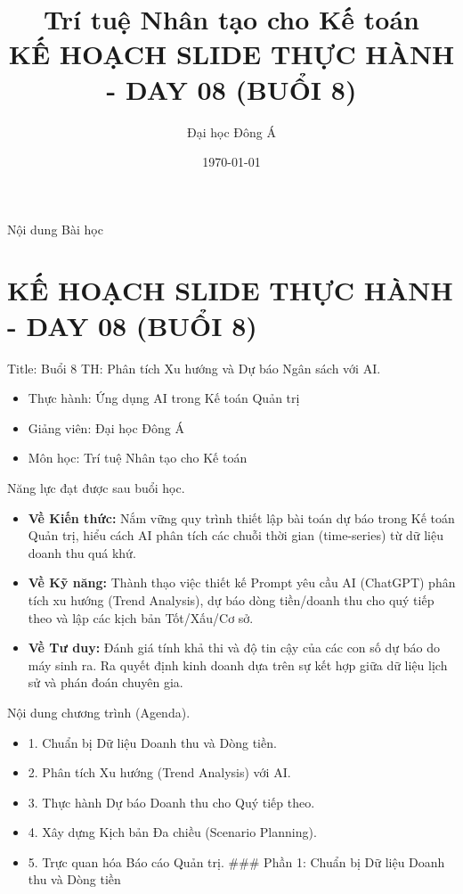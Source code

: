 \documentclass[aspectratio=169]{beamer}
\title[Trí tuệ Nhân tạo cho Kế toán]{Trí tuệ Nhân tạo cho Kế toán \\ \vspace{0.3cm} \Large KẾ HOẠCH SLIDE THỰC HÀNH - DAY 08 (BUỔI 8)}
\author{Đại học Đông Á}
\date{\today}
\begin{document}
\begin{frame}
    \titlepage
\end{frame}

\begin{frame}{Nội dung Bài học}
    \tableofcontents
\end{frame}


\section{KẾ HOẠCH SLIDE THỰC HÀNH - DAY 08 (BUỔI 8)}


\begin{frame}{Title: Buổi 8 TH: Phân tích Xu hướng và Dự báo Ngân sách với AI.}
    \begin{itemize}
        \item Thực hành: Ứng dụng AI trong Kế toán Quản trị
        \item Giảng viên: Đại học Đông Á
        \item Môn học: Trí tuệ Nhân tạo cho Kế toán
    \end{itemize}
\end{frame}


\begin{frame}{Năng lực đạt được sau buổi học.}
    \begin{itemize}
        \item \textbf{Về Kiến thức:} Nắm vững quy trình thiết lập bài toán dự báo trong Kế toán Quản trị, hiểu cách AI phân tích các chuỗi thời gian (time-series) từ dữ liệu doanh thu quá khứ.
        \item \textbf{Về Kỹ năng:} Thành thạo việc thiết kế Prompt yêu cầu AI (ChatGPT) phân tích xu hướng (Trend Analysis), dự báo dòng tiền/doanh thu cho quý tiếp theo và lập các kịch bản Tốt/Xấu/Cơ sở.
        \item \textbf{Về Tư duy:} Đánh giá tính khả thi và độ tin cậy của các con số dự báo do máy sinh ra. Ra quyết định kinh doanh dựa trên sự kết hợp giữa dữ liệu lịch sử và phán đoán chuyên gia.
    \end{itemize}
\end{frame}


\begin{frame}{Nội dung chương trình (Agenda).}
    \begin{itemize}
        \item 1. Chuẩn bị Dữ liệu Doanh thu và Dòng tiền.
        \item 2. Phân tích Xu hướng (Trend Analysis) với AI.
        \item 3. Thực hành Dự báo Doanh thu cho Quý tiếp theo.
        \item 4. Xây dựng Kịch bản Đa chiều (Scenario Planning).
        \item 5. Trực quan hóa Báo cáo Quản trị.
        ### Phần 1: Chuẩn bị Dữ liệu Doanh thu và Dòng tiền
    \end{itemize}
\end{frame}
\end{document}
